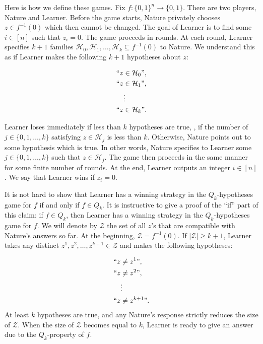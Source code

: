 \documentclass{toc}
\begin{document}
Here is how we define these games. Fix $f\colon\{0, 1\}^n \to \{0, 1\}$. There are two players, Nature and Learner. Before the game starts, Nature privately chooses $z\in f^{-1}(0)$ which then cannot be changed. The goal of Learner is to find some $i\in [n]$ such that $z_i = 0$. The game proceeds in rounds. At each round, Learner specifies $k + 1$ families $\mathcal{H}_0, \mathcal{H}_1, \ldots, \mathcal{H}_{k} \subseteq f^{-1}(0)$ to Nature. We understand this as if Learner makes the following $k + 1$ hypotheses about $z$:

\begin{align*}
``z&\in\mathcal{H}_0\mbox{''}, \\
``z&\in\mathcal{H}_1\mbox{''}, \\
&\vdots \\
``z&\in\mathcal{H}_{k}\mbox{''}.
\end{align*}

Learner loses immediately if less than $k$ hypotheses are true, \ie, if the number of $j\in\{0, 1, \ldots, k\}$ satisfying $z\in\mathcal{H}_j$ is less than $k$. Otherwise, Nature points out to some hypothesis which is true. In other words, Nature specifies to Learner some $j\in \{0, 1, \ldots, k\}$ such that $z\in \mathcal{H}_j$. The game then proceeds in the same manner for some finite number of rounds. At the end, Learner outputs an integer $i\in [n]$. We say that Learner wins if  $z_i = 0$.

It is not hard to show that Learner has a winning strategy in the $Q_k$-hypotheses game for $f$ if and only if $f\in Q_k$. It is instructive to give a proof of the ``if'' part of this claim: if $f\in Q_k$, then Learner has a winning strategy in the $Q_k$-hypotheses game for $f$. We will denote by $\mathcal{Z}$ the set of all $z$'s that are compatible with Nature's answers so far. At the beginning, $\mathcal{Z} = f^{-1}(0)$. If $|\mathcal{Z}| \ge k + 1$, Learner takes any distinct $z^1, z^2, \ldots, z^{k + 1} \in \mathcal{Z}$ and makes the following hypotheses:

\begin{align*}
``z&\neq z^1\mbox{''}, \\
``z&\neq z^2\mbox{''}, \\
&\vdots \\
``z&\neq z^{k + 1}\mbox{''}.
\end{align*}
At least $k$ hypotheses are true, and any Nature's response strictly reduces the size of $\mathcal{Z}$. When the size of $\mathcal{Z}$ becomes equal to $k$, Learner is ready to give an answer due to the $Q_k$-property of $f$.
\end{document}
